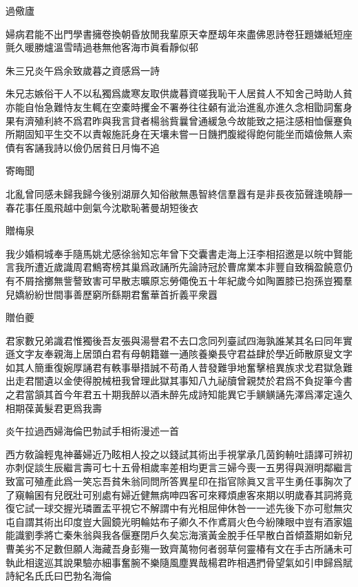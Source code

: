 \documentclass{zhvt-classic-Miya}
\begin{document}
\begin{fw}過儆廬\end{fw}

婦病君能不出門學書擁卷換朝昏放閒我輩原天幸歷刼年來盡佛恩詩卷狂題嫌紙短座氈久暖勝爐溫雪晴過巷無他客海市眞看靜似邨

\begin{fw}朱三兄炎午爲余致歲暮之資感爲一詩\end{fw}

朱兄志嫉俗干人不以私獨爲歲寒友取供歲暮資嗟我恥干人居貧人不知舍己時助人貧亦能自怡急難恃友生輒在空橐時攫金不署券往往顙有泚治進亂亦進久念相勖詞奮身果有濟殖利終不爲君昨與我言貸者楊翁貲曩曾通緩急今故能致之挹注感相恤偃蹇負所期固知平生交不以責報施託身在天壤未嘗一日饑捫腹縱得飽何能坐而嬉儉無人索債有客誦我詩以儉仍居貧日月悔不追

\begin{fw}寄晦聞\end{fw}

北亂曾同感未歸我歸今後别湖扉久知俗敝無愚智終信羣囂有是非長夜笳聲逢曉靜一春花事任風飛越中劍氣今沈歇恥著曼胡短後衣

\begin{fw}贈梅泉\end{fw}

我少婚桐城奉手隨馬姚尤感徐翁知忘年曾下交囊書走海上汪李相招邀是以皖中賢能言我所遭近歲識周君鷦寄榜其巢爲政誦所先論詩冠於曹席業本非豐自致稱盈饒意仍有不屑捨擲無訾謷致害可早散志曠原忘勞僶俛五十年紀歲今如陶置膝已抱孫豈獨羣兒嬌紛紛世間事善歷窮所繇期君奮華首折義平衆囂

\begin{fw}贈伯夔\end{fw}

君家數兄弟識君惟獨後吾友張與湯譽君不去口念同列臺試四海孰誰某其名曰同年實遜文字友奉親海上居頭白君有母朝籍雖一通陔養樂長守君益肆於學近師散原叟文字如其人簡重復婉厚誦君有軼事舉措誠不苟甬人昔發難爭地奮擊棓異族求戈君獄急難出走君闇遺以金使得脫械杻我曾理此獄其事知八九祕牘曾親焚於君爲不負捉筆今書之君當頷其首今年君五十期我醉以酒未醉先成詩知能異它手觵觵誦先澤爲澤定遠久相期葆黃髮君更爲我壽

\begin{fw}炎午拉過西婦海倫巴勃試手相術漫述一首\end{fw}

西方敎論輕鬼神蕃婦近乃眩相人投之以錢試其術出手視掌承几茵鉤輈吐語譯可辨初亦刺促談生辰繼言壽可七十五骨相歲率差相均更言三婦今喪一五男得與淵明鄰繼言致富可殖產此爲一笑忘吾貧朱翁同問所答異星印在指官除眞又言平生勇任事胸次了了窺輪囷有兒旣壯可别處有婦近健無病呻四客可來釋煩慮客來期以明歲春其詞將竟復它試一球交握光璘置盂平視它不解謂中有光相屈伸休咎一一述先後下亦可慰無灾屯自謂其術出印度豈大圓鏡光明輪姑布子卿久不作鳶肩火色今紛陳眼中豈有酒家媼能識劉季將亡秦朱翁與我各偃蹇閉戶久矣忘海濱黃金脫手任早散白首傾蓋期如新兒曹美劣不足數但願人海藏吾身彭殤一致齊萬物何者弱草何靈椿有文在手古所誦未可執此相逡巡其說果驗亦細事奮腕不樂隨風塵異哉楊君昨相遇捫骨望氣如引申歸爲賦詩紀名氏氏曰巴勃名海倫
\end{document}
